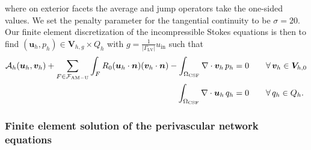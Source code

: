 where on exterior facets the average and jump operators take the one-sided values. We set the penalty parameter for the tangential continuity to be $\sigma = 20$. Our finite element discretization of the incompressible Stokes equations is then to find $(\bm u_h, p_h) \in \bm V_{h,g} \times Q_h$ with $g  = \frac{1}{|\Gamma_{\mathrm{LV}}|} u_{\mathrm{in}}$  such that 
\begin{subequations}
\begin{align}
  \mathcal{A}_h(\bm u_h, \bm v_h)
  + \sum_{F \in \mathcal{F}_{\rm AM-U}} \int_{F} R_0 (\bm u_h \cdot \bm n) (\bm v_h \cdot \bm n)
  - \int_{\Omega_{\rm CSF}} \nabla \cdot \bm v_h \, p_h  &= 0 \qquad \forall \, \bm v_h \in \bm V_{h,0} \\ 
\int_{\Omega_{\rm CSF}} \nabla \cdot \bm u_h \, q_h  &= 0 \qquad \forall \, q_h \in Q_h.
\end{align}
\end{subequations}

\subsubsection{Finite element solution of the perivascular network equations} 


